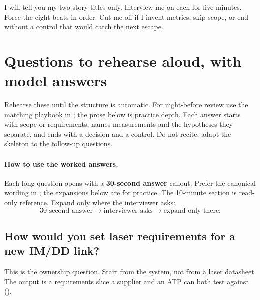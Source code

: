 {I will tell you my two story titles only. Interview me on each for five
minutes. Force the eight beats in order. Cut me off if I invent metrics, skip
scope, or end without a control that would catch the next escape.}

\section{Questions to rehearse aloud, with model answers}

Rehearse these until the structure is automatic. For night-before review use
the matching playbook in ; the prose below is
practice depth. Each answer starts with scope or requirements, names
measurements and the hypotheses they separate, and ends with a decision and a
control. Do not recite; adapt the skeleton to the follow-up questions.

\paragraph{How to use the worked answers.}
Each long question opens with a \textbf{30-second answer} callout. Prefer the
canonical wording in ; the expansions below are
for practice.
The 10-minute section is read-only reference. Expand only where the
interviewer asks:
\[
\text{30-second answer}
\longrightarrow \text{interviewer asks}
\longrightarrow \text{expand only there}.
\]

\subsection{How would you set laser requirements for a new IM/DD link?}
\label{sec:interview-worked-laser-reqs}

This is the ownership question. Start from the system, not from a laser
datasheet. The output is a requirements slice a supplier and an ATP can both
test against ().


